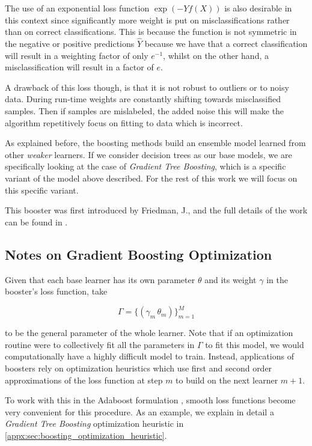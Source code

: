 The use of an exponential loss function $\exp(-Yf(X))$ is also desirable in this context since significantly more weight is put on misclassifications rather than on correct classifications.
This is because the function is not symmetric in the negative or positive predictions $\hat{Y}$ because we have that a correct classification will result in a weighting factor of only $e^{-1}$, whilst on the other hand, a misclassification will result in a factor of $e$.

A drawback of this loss though, is that it is not robust to outliers or to noisy data.
During run-time weights are constantly shifting towards misclassified samples.
Then if samples are mislabeled, the added noise this will make the algorithm repetitively focus on fitting to data which is incorrect.

As explained before, the boosting methods build an ensemble model learned from other \textit{weaker} learners.
If we consider decision trees as our base models, we are specifically looking at the case of \textit{Gradient Tree Boosting}, which is a specific variant of the model above described.
For the rest of this work we will focus on this specific variant.

This booster was first introduced by Friedman, J., and the full details of the work can be found in \citep{friedman-gradientBoosting2001}.


\subsection{Notes on Gradient Boosting Optimization}\label{subsection:boosting_other_notes}

Given that each base learner has its own parameter $\theta$  and its weight $\gamma$ in the booster's loss function, take

$$\Gamma = \{ (\gamma_m\,\theta_m) \}_{m=1}^M$$

to be the general parameter of the whole learner.
Note that if an optimization routine were to collectively fit all the parameters in $\Gamma$ to fit this model, we would computationally have a highly difficult model to train.
Instead, applications of boosters rely on optimization heuristics which use first and second order approximations of the loss function at step $m$ to build on the next learner $m+1$.

To work with this in the Adaboost formulation , smooth loss functions become very convenient for this procedure.
As an example, we explain in detail a \textit{Gradient Tree Boosting} optimization heuristic in \cref{appx:sec:boosting_optimization_heuristic}.

